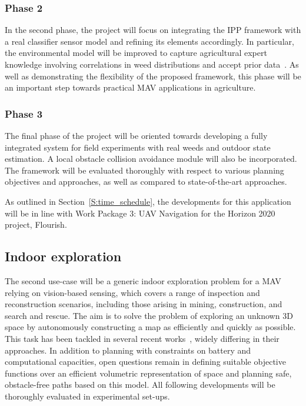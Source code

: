 \subsubsection{Phase 2}

In the second phase, the project will focus on integrating the IPP framework with a real classifier sensor 
model 
and refining its elements accordingly. In particular, the 
environmental model will be improved to capture agricultural expert knowledge involving correlations in 
weed distributions and accept prior data~\cite{Pena2013}. As well as demonstrating the flexibility of the 
proposed framework, this phase will be an important step towards practical MAV applications in agriculture.

\subsubsection{Phase 3}

The final phase of the project will be oriented towards developing a fully integrated system for field 
experiments with real weeds and outdoor state estimation. A local obstacle collision avoidance module will 
also be incorporated. The framework will be evaluated thoroughly with 
respect to various planning objectives and approaches, as well as compared to state-of-the-art approaches.

As outlined in Section~\ref{S:time_schedule}, the developments for this application will be in line with Work 
Package 3: UAV Navigation for the Horizon 2020 project, Flourish.

\subsection{Indoor exploration}

The second use-case will be a generic indoor exploration problem for a MAV relying on vision-based 
sensing, which covers a range of inspection and reconstruction scenarios, including those arising in mining, 
construction, and search and rescue. The aim is to solve the problem of exploring an unknown 3D space by 
autonomously constructing a map as efficiently and quickly as possible. This task has been tackled in several 
recent works~\cite{Charrow2015a, Bircher2016, Heng2015}, widely differing in their approaches. In addition to 
planning with constraints on battery and computational capacities, open questions remain in defining suitable 
objective functions over an efficient volumetric representation of space and planning safe, obstacle-free 
paths based on this model. All following developments will be thoroughly evaluated in experimental set-ups.

